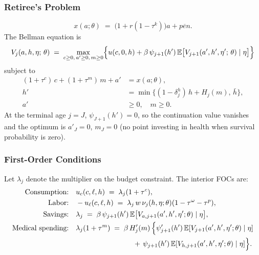 \documentclass[12pt,a4paper]{article}
\newcommand{\E}{\mathbb{E}}
\begin{document}
\subsubsection{Retiree's Problem}
\label{subsubsec:retiree}
\begin{equation}
\label{eq:resources_retiree}
x(a; \theta) \;=\; \bigl(1 + r(1-\tau^k)\bigr) a + \overline{pen}.
\end{equation}
The Bellman equation is
\begin{equation}
\label{eq:retiree_bellman}
V_j(a, h, \eta;\, \theta)
\;=\;
\max_{c \geq 0,\, a' \geq 0,\, m \geq 0}
\Bigl\{
u(c, 0, h)
+ \beta\, \psi_{j+1}(h')\,
\E\bigl[V_{j+1}(a', h', \eta';\, \theta) \mid \eta\bigr]
\Bigr\}
\end{equation}
subject to
\begin{align}
(1 + \tau^c)\, c + (1 + \tau^m)\, m + a' &= x(a; \theta), \label{eq:retiree_budget}\\
h' &= \min\bigl\{(1 - \delta_j^h)\, h + H_j(m),\, \bar h\bigr\}, \label{eq:retiree_health}\\
a' &\geq 0,\quad m \geq 0. \label{eq:retiree_borrow}
\end{align}
At the terminal age $j = J$, $\psi_{J+1}(h') = 0$, so the continuation value vanishes and the optimum is $a'_J = 0$, $m_J = 0$ (no point investing in health when survival probability is zero).

\subsubsection{First-Order Conditions}
\label{subsubsec:focs}

Let $\lambda_j$ denote the multiplier on the budget constraint. The interior FOCs are:
\begin{align}
\text{Consumption:} \quad & u_c(c, \ell, h) \;=\; \lambda_j (1 + \tau^c), \label{eq:foc_c}\\
\text{Labor:} \quad & -u_\ell(c, \ell, h) \;=\; \lambda_j\, w\, \nu_j(h, \eta; \theta)(1-\tau^\omega-\tau^p), \label{eq:foc_l}\\
\text{Savings:} \quad & \lambda_j \;=\; \beta\, \psi_{j+1}(h')\, \E\bigl[V_{a, j+1}(a', h', \eta'; \theta) \mid \eta\bigr], \label{eq:foc_a}\\
\text{Medical spending:} \quad & \lambda_j (1 + \tau^m)
\;=\; \beta\, H_j'(m)\,\Bigl\{
\psi_{j+1}'(h')\, \E[V_{j+1}(a', h', \eta'; \theta) \mid \eta] \notag\\
&\qquad\qquad\qquad\qquad +\, \psi_{j+1}(h')\, \E[V_{h, j+1}(a', h', \eta'; \theta) \mid \eta]
\Bigr\}. \label{eq:foc_m}
\end{align}
\end{document}

